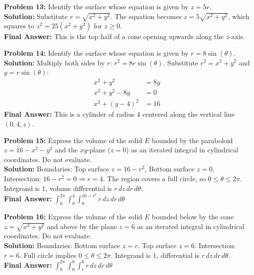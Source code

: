\documentclass[12pt]{article}
\begin{document}
\textbf{Problem 13:} Identify the surface whose equation is given by $z = 5r$.
\\
\textbf{Solution:} Substitute $r = \sqrt{x^2 + y^2}$. The equation becomes $z = 5\sqrt{x^2 + y^2}$, which squares to $z^2 = 25(x^2+y^2)$ for $z \ge 0$.
\\
\textbf{Final Answer:} This is the top half of a cone opening upwards along the $z$-axis.
\vspace{0.5cm}

\textbf{Problem 14:} Identify the surface whose equation is given by $r = 8\sin(\theta)$.
\\
\textbf{Solution:} Multiply both sides by $r$: $r^2 = 8r\sin(\theta)$. Substitute $r^2 = x^2+y^2$ and $y=r\sin(\theta)$:
\begin{align*}
x^2 + y^2 &= 8y \\
x^2 + y^2 - 8y &= 0 \\
x^2 + (y-4)^2 &= 16
\end{align*}
\textbf{Final Answer:} This is a cylinder of radius $4$ centered along the vertical line $(0, 4, z)$.
\vspace{0.5cm}

\textbf{Problem 15:} Express the volume of the solid $E$ bounded by the paraboloid $z = 16 - x^2 - y^2$ and the $xy$-plane ($z = 0$) as an iterated integral in cylindrical coordinates. Do not evaluate.
\\
\textbf{Solution:} Boundaries: Top surface $z = 16 - r^2$, Bottom surface $z = 0$. Intersection: $16 - r^2 = 0 \Rightarrow r = 4$. The region covers a full circle, so $0 \le \theta \le 2\pi$. Integrand is $1$, volume differential is $r \,dz\,dr\,d\theta$.
\\
\textbf{Final Answer:} $\int_0^{2\pi} \int_0^4 \int_0^{16-r^2} r \, dz \, dr \, d\theta$
\vspace{0.5cm}

\textbf{Problem 16:} Express the volume of the solid $E$ bounded below by the cone $z = \sqrt{x^2+y^2}$ and above by the plane $z = 6$ as an iterated integral in cylindrical coordinates. Do not evaluate.
\\
\textbf{Solution:} Boundaries: Bottom surface $z = r$. Top surface $z = 6$. Intersection: $r = 6$. Full circle implies $0 \le \theta \le 2\pi$. Integrand is $1$, differential is $r \,dz\,dr\,d\theta$.
\\
\textbf{Final Answer:} $\int_0^{2\pi} \int_0^6 \int_r^6 r \, dz \, dr \, d\theta$
\vspace{0.5cm}
\end{document}
